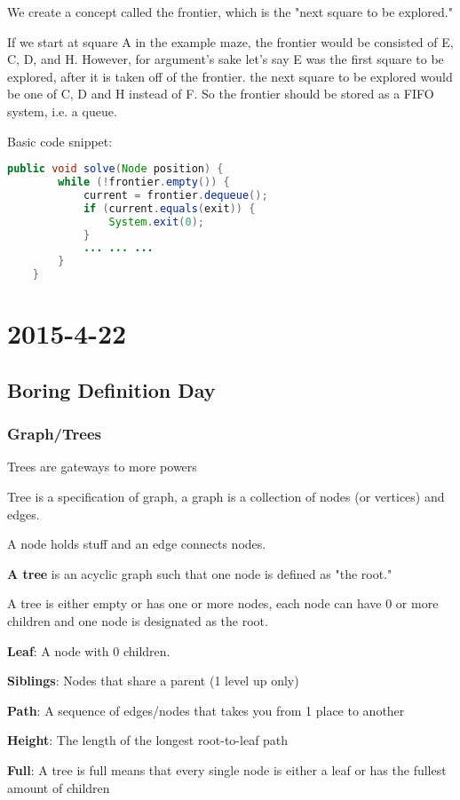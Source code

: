 \documentclass [12 pt, twoside] {article}
\begin{document}
We create a concept called the frontier, which is the "next square to be
explored."

If we start at square A in the example maze, the frontier would be consisted of
E, C, D, and H. However, for argument's sake let's say E was the first square to
be explored, after it is taken off of the frontier. the next square to be
explored would be one of C, D and H instead of F. So the frontier should be
stored as a FIFO system, i.e. a queue.

Basic code snippet:
\begin{lstlisting}[language=java]
    public void solve(Node position) {
        while (!frontier.empty()) {
            current = frontier.dequeue();
            if (current.equals(exit)) {
                System.exit(0);
            }
            ... ... ...
        }
    }
\end{lstlisting}

\section{2015-4-22}
\subsection{Boring Definition Day}
\subsubsection{Graph/Trees}
Trees are gateways to more powers

Tree is a specification of graph, a graph is a collection of nodes (or vertices) and edges.

A node holds stuff and an edge connects nodes.


\textbf{A tree} is an acyclic graph such that one node is defined as "the root."

A tree is either empty or has one or more nodes, each node can have 0 or more
children and one node is designated as the root.

\textbf{Leaf}: A node with 0 children.

\textbf{Siblings}: Nodes that share a parent (1 level up only)

\textbf{Path}: A sequence of edges/nodes that takes you from 1 place to another

\textbf{Height}: The length of the longest root-to-leaf path

\textbf{Full}: A tree is full means that every single node is either a leaf or
has the fullest amount of children
\end{document}

